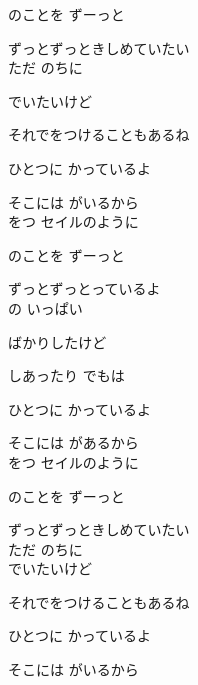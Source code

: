{のことを ずーっと

ずっとずっときしめていたい
\\

ただ のちに

でいたいけど

それでをつけることもあるね

ひとつに かっているよ

そこには がいるから
\\

をつ セイルのように

のことを ずーっと

ずっとずっとっているよ
\\

の いっぱい

ばかりしたけど

しあったり でもは

ひとつに かっているよ

そこには があるから
\\

をつ セイルのように

のことを ずーっと

ずっとずっときしめていたい
\\

ただ のちに
\\

でいたいけど

それでをつけることもあるね

ひとつに かっているよ

そこには がいるから

}